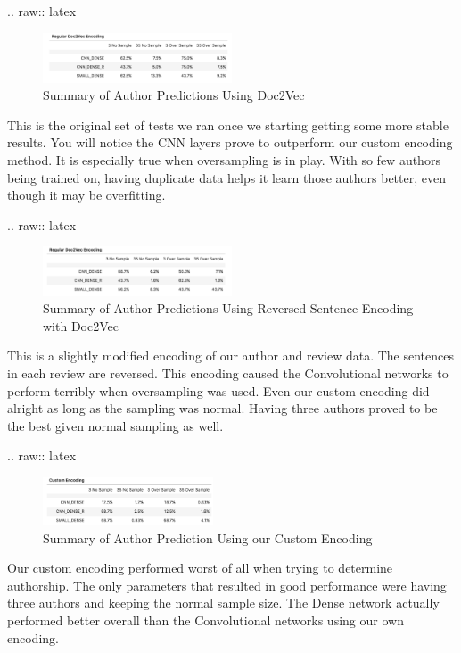 \documentclass[conference]{IEEEtran}
\begin{document}
.. raw:: latex

   \begin{figure}[h!]
     \centering
       \includegraphics[width=0.5\textwidth]{regular_Doc2Vec}
     \caption{Summary of Author Predictions Using Doc2Vec}
   \end{figure}

This is the original set of tests we ran once we starting getting some
more stable results. You will notice the CNN layers prove to outperform
our custom encoding method. It is especially true when oversampling is
in play. With so few authors being trained on, having duplicate data
helps it learn those authors better, even though it may be overfitting.

.. raw:: latex

   \begin{figure}[h!]
     \centering
       \includegraphics[width=0.5\textwidth]{reversed_Doc2Vec}
     \caption{Summary of Author Predictions Using Reversed Sentence Encoding with Doc2Vec}
   \end{figure}

This is a slightly modified encoding of our author and review data. The
sentences in each review are reversed. This encoding caused the
Convolutional networks to perform terribly when oversampling was used.
Even our custom encoding did alright as long as the sampling was normal.
Having three authors proved to be the best given normal sampling as
well.

.. raw:: latex

   \begin{figure}[h!]
     \centering
       \includegraphics[width=0.45\textwidth]{custom}
     \caption{Summary of Author Prediction Using our Custom Encoding}
   \end{figure}

Our custom encoding performed worst of all when trying to determine
authorship. The only parameters that resulted in good performance were
having three authors and keeping the normal sample size. The Dense
network actually performed better overall than the Convolutional
networks using our own encoding.
\end{document}
